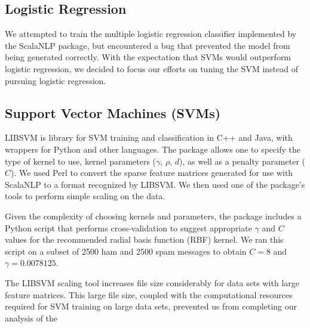 \documentclass[preprint]{acm_proc_article-sp}
\begin{document}
\subsection{Logistic Regression}

We attempted to train the multiple logistic regression classifier implemented by the ScalaNLP package, but encountered a bug that prevented the model from being generated correctly. With the expectation that SVMs would outperform logistic regression, we decided to focus our efforts on tuning the SVM instead of pursuing logistic regression. 


\subsection{Support Vector Machines (SVMs)}




LIBSVM is library for SVM training and classification in C++ and Java, with wrappers for Python and other languages. The package allows one to specify the type of kernel to use, kernel parameters ($\gamma$, $\rho$, $d$), as well as a penalty parameter ($C$). We used Perl to convert the sparse feature matrices generated for use with ScalaNLP to a format recognized by LIBSVM. We then used one of the package's tools to perform simple scaling on the data. 

Given the complexity of choosing kernels and parameters, the package includes a Python script that performs cross-validation to suggest appropriate $\gamma$ and $C$ values for the recommended radial basis function (RBF) kernel. We ran this script on a subset of 2500 ham and 2500 spam messages to obtain $C = 8$ and $\gamma = 0.0078125$.

The LIBSVM scaling tool increases file size considerably for data sets with large feature matrices. This large file size, coupled with the computational resources required for SVM training on large data sets, prevented us from completing our analysis of the 
\end{document}

